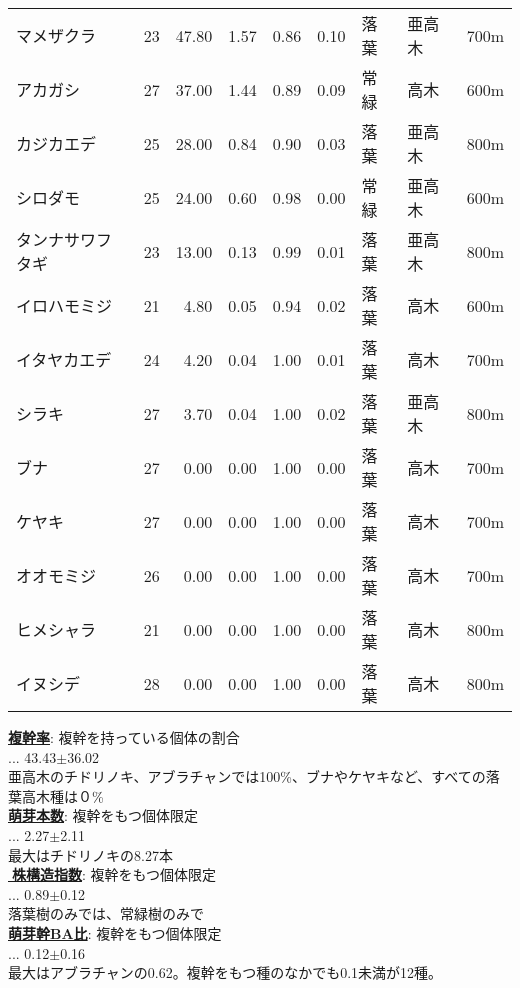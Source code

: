 \documentclass[a0, 30pt, plainboxedsections]{sciposter} %
\begin{document}
\begin{multicols}{2}
\begin{mdframed}[style=subsection.frame,frametitle={\textbf{\LARGE{\ding{192}}\Large{25種の株構造は種間で大きく異なる}}}]
\begin{wraptable}{r}{20em}
{\begin{tabular}{llrrrrlll}
\rowcolor{white}マメザクラ &  23 & 47.80 & 1.57 & 0.86 & 0.10 & 落葉 & 亜高木 & 700m \\ 
\rowcolor{white}アカガシ &  27 & 37.00 & 1.44 & 0.89 & 0.09 & 常緑 & 高木 & 600m \\ 
\rowcolor{white}カジカエデ &  25 & 28.00 & 0.84 & 0.90 & 0.03 & 落葉 & 亜高木 & 800m \\ 
\rowcolor{white}シロダモ &  25 & 24.00 & 0.60 & 0.98 & 0.00 & 常緑 & 亜高木 & 600m \\ 
\rowcolor{white}タンナサワフタギ &  23 & 13.00 & 0.13 & 0.99 & 0.01 & 落葉 & 亜高木 & 800m \\ 
\rowcolor{white}イロハモミジ &  21 & 4.80 & 0.05 & 0.94 & 0.02 & 落葉 & 高木 & 600m \\ 
\rowcolor{white}イタヤカエデ &  24 & 4.20 & 0.04 & 1.00 & 0.01 & 落葉 & 高木 & 700m \\ 
\rowcolor{white}シラキ &  27 & 3.70 & 0.04 & 1.00 & 0.02 & 落葉 & 亜高木 & 800m \\ 
\rowcolor{Blue2!80}ブナ &  27 & 0.00 & 0.00 & 1.00 & 0.00 & 落葉 & 高木 & 700m \\ 
\rowcolor{Blue2!80}ケヤキ &  27 & 0.00 & 0.00 & 1.00 & 0.00 & 落葉 & 高木 & 700m \\ 
\rowcolor{Blue2!80}オオモミジ &  26 & 0.00 & 0.00 & 1.00 & 0.00 & 落葉 & 高木 & 700m \\ 
\rowcolor{Blue2!80}ヒメシャラ &  21 & 0.00 & 0.00 & 1.00 & 0.00 & 落葉 & 高木 & 800m \\ 
\rowcolor{Blue2!80}イヌシデ &  28 & 0.00 & 0.00 & 1.00 & 0.00 & 落葉 & 高木 & 800m \\ 
   \hline
\end{tabular}}
\end{wraptable}

\textbf{\underline{複幹率}}{\footnotesize: 複幹を持っている個体の割合}\\... 43.43$\pm$36.02\\
{\scriptsize 亜高木のチドリノキ、アブラチャンでは100\%、ブナやケヤキなど、すべての落葉高木種は０\%}\\
\textbf{\underline{萌芽本数}}{\footnotesize: 複幹をもつ個体限定}\\... 2.27$\pm$2.11\\
{\scriptsize 最大はチドリノキの8.27本}\\
\textbf{\underline{株構造指数}}{\footnotesize: 複幹をもつ個体限定}\\... 0.89$\pm$0.12\\
{\scriptsize 落葉樹のみでは、常緑樹のみで}\\
\textbf{\underline{萌芽幹BA比}}{\footnotesize: 複幹をもつ個体限定}\\... 0.12$\pm$0.16\\
{\scriptsize 最大はアブラチャンの0.62。複幹をもつ種のなかでも0.1未満が12種。}


\end{mdframed}
\end{multicols}
\end{document}
